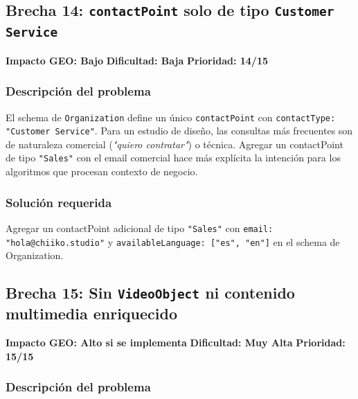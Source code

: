 \documentclass[12pt, a4paper]{article}
\begin{document}
\subsection{Brecha 14: \texttt{contactPoint} solo de tipo \texttt{Customer Service}}

\begin{lowbox}
\textbf{Impacto GEO: Bajo} \quad \textbf{Dificultad: Baja} \quad \textbf{Prioridad: 14/15}
\end{lowbox}

\subsubsection{Descripción del problema}

El schema de \texttt{Organization} define un único \texttt{contactPoint} con \texttt{contactType: "Customer Service"}. Para un estudio de diseño, las consultas más frecuentes son de naturaleza comercial (\textit{"quiero contratar"}) o técnica. Agregar un contactPoint de tipo \texttt{"Sales"} con el email comercial hace más explícita la intención para los algoritmos que procesan contexto de negocio.

\subsubsection{Solución requerida}

Agregar un contactPoint adicional de tipo \texttt{"Sales"} con \texttt{email: "hola@chiiko.studio"} y \texttt{availableLanguage: ["es", "en"]} en el schema de Organization.

\subsection{Brecha 15: Sin \texttt{VideoObject} ni contenido multimedia enriquecido}

\begin{lowbox}
\textbf{Impacto GEO: Alto si se implementa} \quad \textbf{Dificultad: Muy Alta} \quad \textbf{Prioridad: 15/15}
\end{lowbox}

\subsubsection{Descripción del problema}
\end{document}
